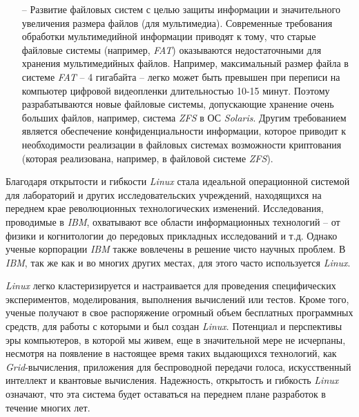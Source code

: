 \begin{itemize}
	\item[--] Развитие файловых систем с целью защиты информации и значительного увеличения размера файлов (для мультимедиа). Современные требования обработки мультимедийной информации приводят к тому, что старые файловые системы (например, \textit{FAT}) оказываются недостаточными для хранения мультимедийных файлов. Например, максимальный размер файла в системе \textit{FAT} – 4 гигабайта – легко может быть превышен при переписи на компьютер цифровой видеопленки длительностью 10-15 минут. Поэтому разрабатываются новые файловые системы, допускающие хранение очень больших файлов, например, система \textit{ZFS} в ОС \textit{Solaris}. Другим требованием является обеспечение конфиденциальности информации, которое приводит к необходимости реализации в файловых системах возможности криптования (которая реализована, например, в файловой системе \textit{ZFS}).
\end{itemize}

Благодаря открытости и гибкости \textit{Linux} стала идеальной операционной системой для лабораторий и других исследовательских учреждений, находящихся на переднем крае революционных технологических изменений.  Исследования, проводимые в \textit{IBM}, охватывают все области информационных технологий – от физики и когнитологии до передовых прикладных исследований и т.д. Однако ученые корпорации \textit{IBM} также вовлечены в решение чисто научных проблем.  В \textit{IBM}, так же как и во многих других местах, для этого часто используется \textit{Linux}.

\textit{Linux} легко кластеризируется и настраивается для проведения специфических экспериментов, моделирования, выполнения вычислений или тестов. Кроме того, ученые получают в свое распоряжение огромный объем бесплатных программных средств, для работы с которыми и был создан \textit{Linux}.   Потенциал и перспективы эры компьютеров, в которой мы живем, еще в значительной мере не исчерпаны, несмотря на появление в настоящее время таких выдающихся технологий, как \textit{Grid}-вычисления, приложения для беспроводной передачи голоса, искусственный интеллект и квантовые вычисления. Надежность, открытость и гибкость \textit{Linux} означают, что эта система будет оставаться на переднем плане разработок в течение многих лет.
